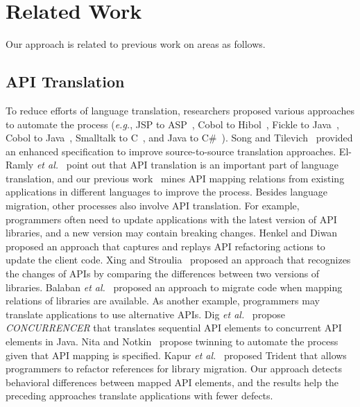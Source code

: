 \section{Related Work}
\label{sec:related}

Our approach is related to previous work on areas as follows.

\subsection{API Translation} To reduce efforts of language translation, researchers proposed various
approaches to automate the process (\emph{e.g.}, JSP to ASP~\citep{hassan2005lightweight}, Cobol to Hibol~\citep{waters1988program}, Fickle to Java~\citep{ancona2007provenly}, Cobol to Java~\citep{mossienko2003automated}, Smalltalk to C~\citep{yasumatsu1995spice}, and Java to C\#~\citep{el2006experiment}). Song and Tilevich~\citep{song2009enhancing} provided an enhanced specification to improve source-to-source translation approaches. El-Ramly \emph{et al.}~\citep{el2006experiment} point out that API translation is an important part of language translation, and our previous work~\citep{zhong2010mining} mines API mapping relations from existing applications in different languages to improve the process. Besides language migration, other processes also involve API translation. For example, programmers often need to update applications with the latest version of API libraries, and a new version may contain breaking changes. Henkel and Diwan~\citep{henkel2005catchup} proposed an approach that captures and replays API refactoring actions to update the client code. Xing and Stroulia~\citep{xing2007api} proposed an approach that recognizes the changes of APIs by comparing the differences between two versions of libraries. Balaban \emph{et al.}~\citep{balaban2005refactoring} proposed an approach to migrate code when mapping relations of libraries are available. As another example, programmers may translate applications to use alternative APIs. Dig \emph{et al.}~\citep{dig2009refactoring} propose \emph{CONCURRENCER} that translates sequential API elements to concurrent API elements in Java. Nita and Notkin~\citep{nita2010using} propose twinning to automate the process given that API mapping is specified. Kapur \emph{et al.}~\citep{kapur2010refactoring} proposed Trident that allows programmers to refactor references for library migration.
Our approach detects behavioral differences between mapped API elements, and the results help the preceding approaches translate applications with fewer defects.

